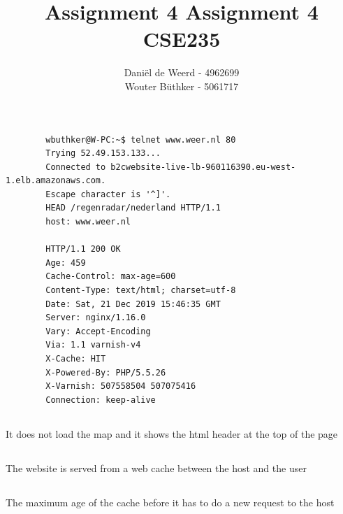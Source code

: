 \documentclass{article}
\title{Assignment 4}
\begin{document}
    \title{%
    Assignment 4 \\
    \large CSE235
    }
    
    \author{Daniël de Weerd - 4962699 \\
    Wouter Büthker - 5061717
    }
    
    \maketitle
    
    \section{}
    \subsection{}
    \begin{verbatim}
        wbuthker@W-PC:~$ telnet www.weer.nl 80
        Trying 52.49.153.133...
        Connected to b2cwebsite-live-lb-960116390.eu-west-1.elb.amazonaws.com.
        Escape character is '^]'.
        HEAD /regenradar/nederland HTTP/1.1
        host: www.weer.nl

        HTTP/1.1 200 OK
        Age: 459
        Cache-Control: max-age=600
        Content-Type: text/html; charset=utf-8
        Date: Sat, 21 Dec 2019 15:46:35 GMT
        Server: nginx/1.16.0
        Vary: Accept-Encoding
        Via: 1.1 varnish-v4
        X-Cache: HIT
        X-Powered-By: PHP/5.5.26
        X-Varnish: 507558504 507075416
        Connection: keep-alive

     \end{verbatim}

     \subsection{}
     It does not load the map and it shows the html header at the top of the page

     \subsection{}
     The website is served from a web cache between the host and the user

     \subsection{}
     The maximum age of the cache before it has to do a new request to the host
\end{document}
